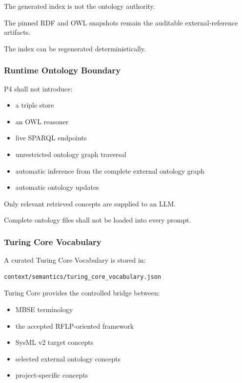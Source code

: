 The generated index is not the ontology authority.

The pinned RDF and OWL snapshots remain the auditable external-reference artifacts.

The index can be regenerated deterministically.

\hypertarget{runtime-ontology-boundary}{%
\subsubsection{Runtime Ontology Boundary}\label{runtime-ontology-boundary}}

P4 shall not introduce:

\begin{itemize}
\tightlist
\item
  a triple store
\item
  an OWL reasoner
\item
  live SPARQL endpoints
\item
  unrestricted ontology graph traversal
\item
  automatic inference from the complete external ontology graph
\item
  automatic ontology updates
\end{itemize}

Only relevant retrieved concepts are supplied to an LLM.

Complete ontology files shall not be loaded into every prompt.

\hypertarget{turing-core-vocabulary}{%
\subsubsection{Turing Core Vocabulary}\label{turing-core-vocabulary}}

A curated Turing Core Vocabulary is stored in:

\begin{verbatim}
context/semantics/turing_core_vocabulary.json
\end{verbatim}

Turing Core provides the controlled bridge between:

\begin{itemize}
\tightlist
\item
  MBSE terminology
\item
  the accepted RFLP-oriented framework
\item
  SysML v2 target concepts
\item
  selected external ontology concepts
\item
  project-specific concepts
\end{itemize}

